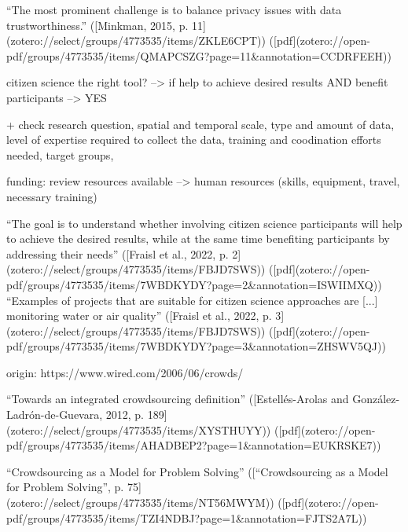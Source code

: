 “The most prominent challenge is to balance privacy issues with data trustworthiness.” ([Minkman, 2015, p. 11](zotero://select/groups/4773535/items/ZKLE6CPT)) ([pdf](zotero://open-pdf/groups/4773535/items/QMAPCSZG?page=11&annotation=CCDRFEEH))



citizen science the right tool?
--> if help to achieve desired results AND benefit participants --> YES

+ check research question, spatial and temporal scale, type and amount of data, level of expertise required to collect the data, training and coodination efforts needed, target groups, 

funding: review resources available --> human resources (skills, equipment, travel, necessary training)



“The goal is to understand whether involving citizen science participants will help to achieve the desired results, while at the same time benefiting participants by addressing their needs” ([Fraisl et al., 2022, p. 2](zotero://select/groups/4773535/items/FBJD7SWS)) ([pdf](zotero://open-pdf/groups/4773535/items/7WBDKYDY?page=2&annotation=ISWIIMXQ))
“Examples of projects that are suitable for citizen science approaches are [...] monitoring water or air quality” ([Fraisl et al., 2022, p. 3](zotero://select/groups/4773535/items/FBJD7SWS)) ([pdf](zotero://open-pdf/groups/4773535/items/7WBDKYDY?page=3&annotation=ZHSWV5QJ))

origin: https://www.wired.com/2006/06/crowds/

“Towards an integrated crowdsourcing definition” ([Estellés-Arolas and González-Ladrón-de-Guevara, 2012, p. 189](zotero://select/groups/4773535/items/XYSTHUYY)) ([pdf](zotero://open-pdf/groups/4773535/items/AHADBEP2?page=1&annotation=EUKRSKE7))

“Crowdsourcing as a Model for Problem Solving” ([“Crowdsourcing as a Model for Problem Solving”, p. 75](zotero://select/groups/4773535/items/NT56MWYM)) ([pdf](zotero://open-pdf/groups/4773535/items/TZI4NDBJ?page=1&annotation=FJTS2A7L))


